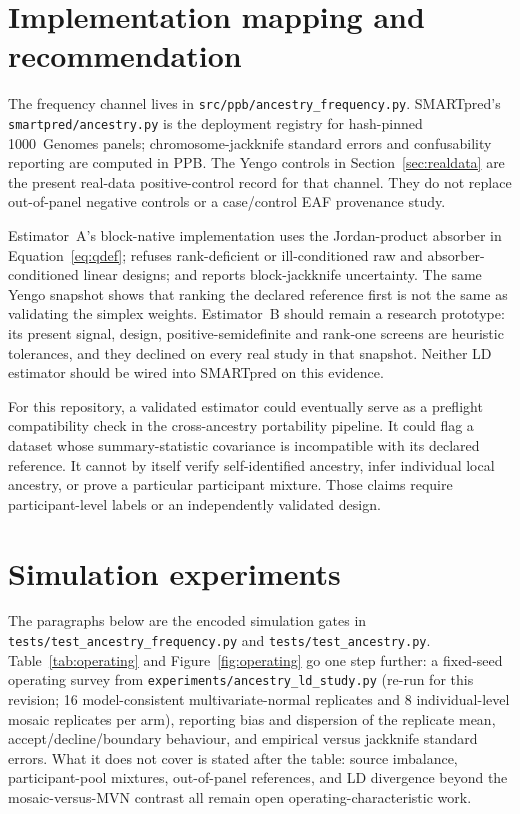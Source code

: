 \documentclass[11pt,a4paper]{article}
\begin{document}
\section{Implementation mapping and recommendation}\label{sec:implementation}

The frequency channel lives in \texttt{src/ppb/ancestry\_frequency.py}.
SMARTpred's \texttt{smartpred/ancestry.py} is the deployment registry for
hash-pinned 1000~Genomes panels; chromosome-jackknife standard errors and
confusability reporting are computed in PPB.
The Yengo controls in Section~\ref{sec:realdata} are the present real-data
positive-control record for that channel. They do not replace
out-of-panel negative controls or a case/control EAF provenance study.

Estimator~A's block-native implementation uses the Jordan-product
absorber in Equation~\eqref{eq:qdef}; refuses rank-deficient or
ill-conditioned raw and absorber-conditioned linear designs; and reports
block-jackknife uncertainty. The same Yengo snapshot shows that ranking the
declared reference first is not the same as validating the simplex
weights. Estimator~B should remain a research prototype: its present
signal, design, positive-semidefinite and rank-one screens are heuristic
tolerances, and they declined on every real study in that snapshot.
Neither LD estimator should be wired into SMARTpred on this evidence.

For this repository, a validated estimator could eventually serve as a
preflight compatibility check in the cross-ancestry portability pipeline.
It could flag a dataset whose summary-statistic covariance is incompatible
with its declared reference. It cannot by itself verify self-identified
ancestry, infer individual local ancestry, or prove a particular participant
mixture. Those claims require participant-level labels or an independently
validated design.

\section{Simulation experiments}\label{sec:simulation}

The paragraphs below are the encoded simulation gates in
\texttt{tests/test\_ancestry\_frequency.py} and
\texttt{tests/test\_ancestry.py}. Table~\ref{tab:operating} and
Figure~\ref{fig:operating} go one step further: a fixed-seed operating
survey from \texttt{experiments/ancestry\_ld\_study.py} (re-run for this
revision; 16 model-consistent multivariate-normal replicates and 8
individual-level mosaic replicates per arm), reporting bias and dispersion
of the replicate mean, accept/decline/boundary behaviour, and empirical
versus jackknife standard errors. What it does not cover is stated after
the table: source imbalance, participant-pool mixtures, out-of-panel
references, and LD divergence beyond the mosaic-versus-MVN contrast all
remain open operating-characteristic work.
\end{document}
